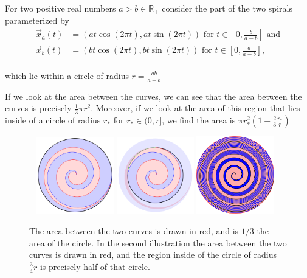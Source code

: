 \documentclass{article}
\begin{document}
For two positive real numbers $a > b \in \mathbb{R}_+$ consider the part of the
two spirals parameterized by \begin{align*}
  \vec{x}_a(t) &= (at\cos(2\pi t), at\sin(2\pi t)) \text{ for } t \in \left[0,\frac{b}{a-b}\right] \text{ and}\\
  \vec{x}_b(t) &= (bt\cos(2\pi t), bt\sin(2\pi t)) \text{ for } t \in \left[0,\frac{a}{a-b}\right],
\end{align*}\\[-10pt] which lie within a circle of radius $\displaystyle r=\frac{ab}{a-b}$

If we look at the area between the curves, we can see that the area between
the curves is precisely \(\frac{1}{3}\pi r^2\).
Moreover, if we look at the area of this region that lies inside of a circle of
radius $r_*$ for $r_* \in (0, r]$, we find the area is \(
  \pi r_*^2 \left(1 - \frac23\frac{r_*}{r}\right)
\)
\begin{figure}[ht!]
  ~
  \hfill
  \includegraphics[width=0.3\textwidth]{assets/132_problem/spiral_100.png}
  \hfill
  \includegraphics[width=0.3\textwidth]{assets/132_problem/spiral_075.png}
  \hfill
  \includegraphics[width=0.3\textwidth]{assets/132_problem/outside_spiral.png}
  \caption{
    The area between the two curves is drawn in red, and is $1/3$ the area of the
    circle.
    In the second illustration the area between the two curves is drawn in red,
    and the region inside of the circle of radius $\frac34r$ is precisely half
    of that circle.
  }
\end{figure}
\end{document}
